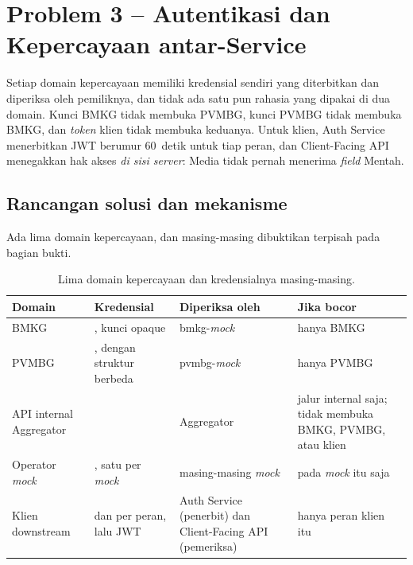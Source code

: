 \chapter{Problem 3 -- Autentikasi dan Kepercayaan antar-Service}

\begin{ringkas}
Setiap domain kepercayaan memiliki kredensial sendiri yang diterbitkan dan diperiksa oleh pemiliknya, dan tidak ada satu
pun rahasia yang dipakai di dua domain. Kunci BMKG tidak membuka PVMBG, kunci PVMBG tidak membuka BMKG, dan \emph{token} klien
tidak membuka keduanya. Untuk klien, Auth Service menerbitkan JWT berumur 60~detik untuk tiap peran, dan Client-Facing
API menegakkan hak akses \emph{di sisi server}: Media tidak pernah menerima \emph{field} Mentah.
\end{ringkas}

\section{Rancangan solusi dan mekanisme}

Ada lima domain kepercayaan, dan masing-masing dibuktikan terpisah pada bagian bukti.

\begin{table}[H]
\centering\small
\begin{tabularx}{\textwidth}{@{}L{2.5cm}L{4.1cm}L{2.7cm}Y@{}}
\toprule
\textbf{Domain} & \textbf{Kredensial} & \textbf{Diperiksa oleh} & \textbf{Jika bocor}\\
\midrule
BMKG & , kunci opaque & bmkg-\emph{mock} & hanya BMKG\\
PVMBG & , dengan struktur berbeda & pvmbg-\emph{mock} & hanya PVMBG\\
API internal Aggregator &  & Aggregator & jalur internal saja; tidak membuka BMKG, PVMBG, atau klien\\
Operator \emph{mock} & , satu per \emph{mock} & masing-masing \emph{mock} &  pada \emph{mock} itu saja\\
Klien downstream &  dan  per peran, lalu JWT & Auth Service (penerbit) dan Client-Facing API (pemeriksa) & hanya peran klien itu\\
\bottomrule
\end{tabularx}
\caption{Lima domain kepercayaan dan kredensialnya masing-masing.}
\end{table}

